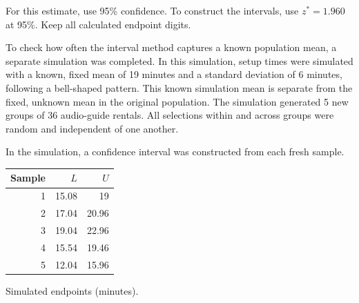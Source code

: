 For this estimate, use 95\% confidence. To construct the intervals, use $z^*=1.960$ at 95\%. Keep all calculated endpoint digits.

To check how often the interval method captures a known population mean, a separate simulation was completed. In this simulation, setup times were simulated with a known, fixed mean of 19 minutes and a standard deviation of 6 minutes, following a bell-shaped pattern. This known simulation mean is separate from the fixed, unknown mean in the original population. The simulation generated 5 new groups of 36 audio-guide rentals. All selections within and across groups were random and independent of one another.

In the simulation, a confidence interval was constructed from each fresh sample.
\par\medskip\noindent\begin{minipage}[t]{.27\linewidth}\vspace{0pt}\begin{center}\begin{tabular}{@{}rrr@{}}\toprule
Sample & $L$ & $U$\\\midrule
1 & 15.08 & 19 \\[6pt]
2 & 17.04 & 20.96 \\[6pt]
3 & 19.04 & 22.96 \\[6pt]
4 & 15.54 & 19.46 \\[6pt]
5 & 12.04 & 15.96 \\[6pt]
\bottomrule\end{tabular}\par\small Simulated endpoints (minutes).\end{center}\end{minipage}\hfill\begin{minipage}[t]{.69\linewidth}\vspace{0pt}
\begin{center}
\end{center}
\end{minipage}
